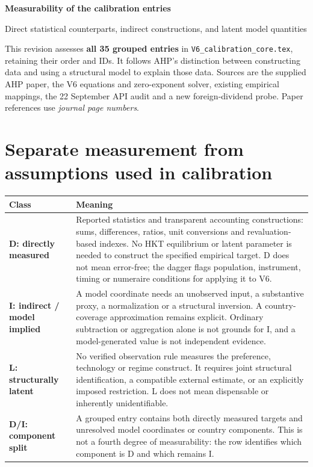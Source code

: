 \documentclass[10pt,a4paper,landscape]{article}
\newcommand{\code}[1]{{\footnotesize\texttt{#1}}}
\begin{document}
{\LARGE\sffamily\bfseries\color{heading}Measurability of the calibration entries}\par
{\large\sffamily Direct statistical counterparts, indirect constructions, and latent model quantities}\par

This revision assesses \textbf{all 35 grouped entries} in \code{V6\_calibration\_core.tex}, retaining their order and IDs. It follows AHP's distinction between constructing data and using a structural model to explain those data. Sources are the supplied AHP paper, the V6 equations and zero-exponent solver, existing empirical mappings, the 22 September API audit and a new foreign-dividend probe. Paper references use \emph{journal page numbers}.

\section*{Separate measurement from assumptions used in calibration}
\begin{longtable}{@{}P{.17\textwidth}P{.79\textwidth}@{}}
\toprule{}\textbf{Class} & \textbf{Meaning}\\\midrule
\textbf{D: directly measured} & Reported statistics and transparent accounting constructions: sums, differences, ratios, unit conversions and revaluation-based indexes. No HKT equilibrium or latent parameter is needed to construct the specified empirical target. D does not mean error-free; the dagger flags population, instrument, timing or numeraire conditions for applying it to V6.\\[5pt]
\textbf{I: indirect / model implied} & A model coordinate needs an unobserved input, a substantive proxy, a normalization or a structural inversion. A country-coverage approximation remains explicit. Ordinary subtraction or aggregation alone is not grounds for I, and a model-generated value is not independent evidence.\\[5pt]
\textbf{L: structurally latent} & No verified observation rule measures the preference, technology or regime construct. It requires joint structural identification, a compatible external estimate, or an explicitly imposed restriction. L does not mean dispensable or inherently unidentifiable.\\
\textbf{D/I: component split} & A grouped entry contains both directly measured targets and unresolved model coordinates or country components. This is not a fourth degree of measurability: the row identifies which component is D and which remains I.\\[5pt]
\bottomrule
\end{longtable}
\end{document}
